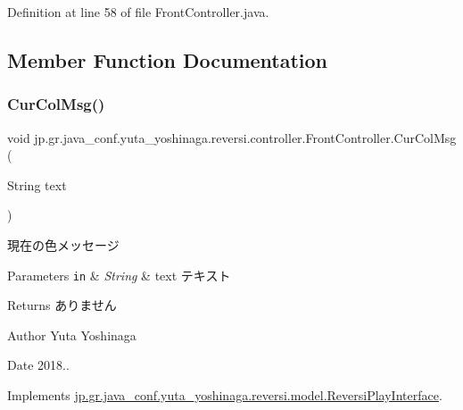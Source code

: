 Definition at line 58 of file Front\+Controller.\+java.



\subsection{Member Function Documentation}
\mbox{\label{classjp_1_1gr_1_1java__conf_1_1yuta__yoshinaga_1_1reversi_1_1controller_1_1_front_controller_ac49c44c8bb767770364c52164b699110}} 
\subsubsection{\texorpdfstring{Cur\+Col\+Msg()}{CurColMsg()}}
{\footnotesize\ttfamily void jp.\+gr.\+java\+\_\+conf.\+yuta\+\_\+yoshinaga.\+reversi.\+controller.\+Front\+Controller.\+Cur\+Col\+Msg (\begin{DoxyParamCaption}\item[{String}]{text }\end{DoxyParamCaption})}



現在の色メッセージ 


\begin{DoxyParams}[1]{Parameters}
\mbox{\tt in}  & {\em String} & text テキスト \\
\hline
\end{DoxyParams}
\begin{DoxyReturn}{Returns}
ありません 
\end{DoxyReturn}
\begin{DoxyAuthor}{Author}
Yuta Yoshinaga 
\end{DoxyAuthor}
\begin{DoxyDate}{Date}
2018.. 
\end{DoxyDate}


Implements \hyperlink{interfacejp_1_1gr_1_1java__conf_1_1yuta__yoshinaga_1_1reversi_1_1model_1_1_reversi_play_interface_a73764de038c314fd103a91d402049a0c}{jp.\+gr.\+java\+\_\+conf.\+yuta\+\_\+yoshinaga.\+reversi.\+model.\+Reversi\+Play\+Interface}.



